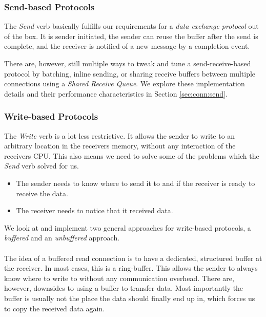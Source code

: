 \subsubsection{Send-based Protocols}
The \emph{Send} verb basically fulfills our requirements for a \emph{data exchange protocol} out of the box. It is sender
initiated, the sender can reuse the buffer after the send is complete, and the receiver is notified of a new message by
a completion event.

There are, however, still multiple ways to tweak and tune a send-receive-based protocol by batching, inline sending, or 
sharing receive buffers between multiple connections using a \emph{Shared Receive Queue}. We explore these implementation 
details and their performance characteristics in Section \ref{sec:conn:send}.

\subsubsection{Write-based Protocols}
The \emph{Write} verb is a lot less restrictive. It allows the sender to write to an arbitrary 
location in the receivers memory, without any interaction of the receivers CPU. This also means we need to solve some of the 
problems which the \emph{Send} verb solved for us.

\begin{itemize}
  \item The sender needs to know where to send it to and if the receiver is ready to receive the data.

  \item The receiver needs to notice that it received data.
\end{itemize}

We look at and implement two general approaches for write-based protocols, a \emph{buffered} and an \emph{unbuffered} approach.

\paragraph{} The idea of a buffered read connection is to have a dedicated, structured buffer at the receiver. In most cases, 
this is a ring-buffer. This allows the sender to always know where to write to without any communication overhead. There 
are, however, downsides to using a buffer to transfer data. Most importantly the buffer is usually not the place the 
data should finally end up in, which forces us to copy the received data again.

